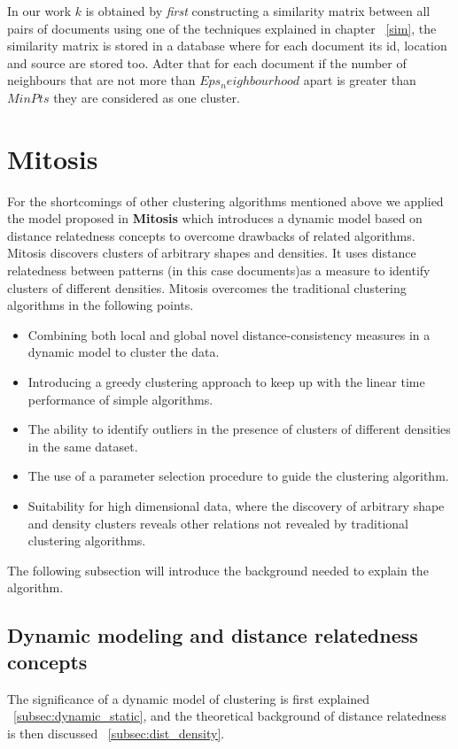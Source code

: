 In our work $k$ is obtained by \textit{first} constructing a similarity matrix between all pairs of documents using one of the techniques explained in chapter ~\ref{sim}, the similarity matrix is stored in a database where for each document its id, location and source are stored too. Adter that for each document if the number of neighbours that are not more than $Eps_neighbourhood$ apart is greater than $MinPts$ they are considered as one cluster.

\section{Mitosis}
For the shortcomings of other clustering algorithms mentioned above we applied the model proposed in \textbf{Mitosis} \citep{Mitosis_1} which introduces a dynamic model based on distance relatedness concepts to overcome drawbacks of related algorithms. Mitosis discovers clusters of arbitrary shapes and densities. It uses distance relatedness between patterns (in this case documents)as a measure to identify clusters of different densities.
Mitosis overcomes the traditional clustering algorithms in the following points.
\begin{itemize}
\item{Combining both local and global novel distance-consistency measures in a dynamic model to cluster the data.}
\item{Introducing a greedy clustering approach to keep up with the linear time performance of simple algorithms.}
\item{The ability to identify outliers in the presence of clusters of different densities in the same dataset.}
\item{The use of a parameter selection procedure to guide the clustering algorithm.}
\item{Suitability for high dimensional data, where the discovery of arbitrary shape and density clusters reveals other relations not revealed by traditional clustering algorithms.}
\end{itemize}
The following subsection will introduce the background needed to explain the algorithm.
\subsection{Dynamic modeling and distance relatedness concepts}\label{sec:background}

The significance of a dynamic model of clustering is first explained ~\ref{subsec:dynamic_static}, and the theoretical background of distance relatedness is then discussed ~\ref{subsec:dist_density}.

